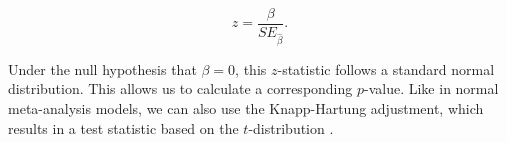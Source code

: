 \documentclass[../../../main.tex]{subfiles}
\begin{document}
\begin{equation}
z = \frac{\beta}{SE_{\hat{\beta}}}.
\end{equation}

Under the null hypothesis that $\beta=0$, this $z$-statistic follows a standard normal distribution. This allows us to calculate a corresponding $p$-value. Like in normal meta-analysis models, we can also use the Knapp-Hartung adjustment, which results in a test statistic based on the $t$-distribution \autocite{Harrer2021}.
\end{document}
